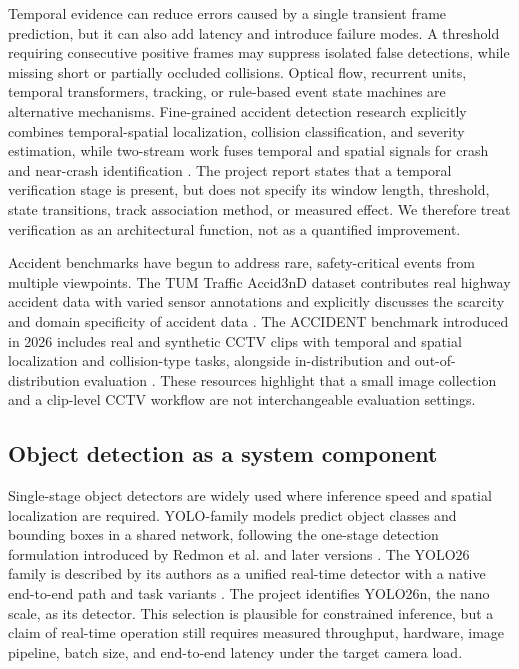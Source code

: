 \documentclass[12pt,a4paper]{article}
\begin{document}
Temporal evidence can reduce errors caused by a single transient frame prediction, but it can also add latency and introduce failure modes. A threshold requiring consecutive positive frames may suppress isolated false detections, while missing short or partially occluded collisions. Optical flow, recurrent units, temporal transformers, tracking, or rule-based event state machines are alternative mechanisms. Fine-grained accident detection research explicitly combines temporal-spatial localization, collision classification, and severity estimation, while two-stream work fuses temporal and spatial signals for crash and near-crash identification \cite{yu2024fine,shi2024two}. The project report states that a temporal verification stage is present, but does not specify its window length, threshold, state transitions, track association method, or measured effect. We therefore treat verification as an architectural function, not as a quantified improvement.

Accident benchmarks have begun to address rare, safety-critical events from multiple viewpoints. The TUM Traffic Accid3nD dataset contributes real highway accident data with varied sensor annotations and explicitly discusses the scarcity and domain specificity of accident data \cite{zimmer2025}. The ACCIDENT benchmark introduced in 2026 includes real and synthetic CCTV clips with temporal and spatial localization and collision-type tasks, alongside in-distribution and out-of-distribution evaluation \cite{picek2026}. These resources highlight that a small image collection and a clip-level CCTV workflow are not interchangeable evaluation settings.

\subsection{Object detection as a system component}
Single-stage object detectors are widely used where inference speed and spatial localization are required. YOLO-family models predict object classes and bounding boxes in a shared network, following the one-stage detection formulation introduced by Redmon et al. and later versions \cite{redmon2016,redmon2018}. The YOLO26 family is described by its authors as a unified real-time detector with a native end-to-end path and task variants \cite{jocher2026}. The project identifies YOLO26n, the nano scale, as its detector. This selection is plausible for constrained inference, but a claim of real-time operation still requires measured throughput, hardware, image pipeline, batch size, and end-to-end latency under the target camera load.
\end{document}
